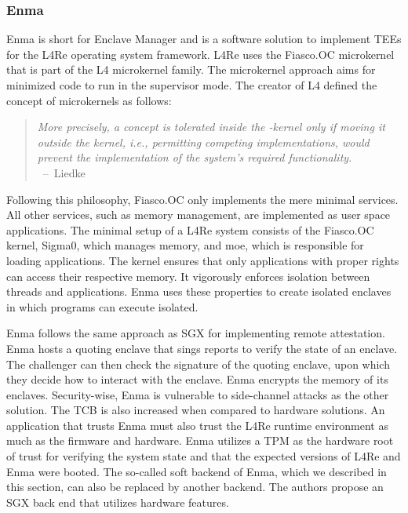 \subsubsection{Enma}
\label{sec:20:enma}
Enma is short for Enclave Manager and is a software solution to implement TEEs for the L4Re operating system framework.
\cite{reitz_isolierende_2019}
L4Re uses the Fiasco.OC microkernel that is part of the L4 microkernel family. The microkernel approach aims for
minimized code to run in the supervisor mode. The creator of L4 defined the concept of microkernels as follows:

\begin{quote}
    \textit{
        More precisely, a concept is tolerated inside the \mu-kernel only if moving it outside the kernel, i.e.,
        permitting competing implementations, would prevent the implementation of the system's required
        functionality. \\
    }
    \mbox{ -- Liedke\cite{liedtke1995micro}}
\end{quote}


Following this philosophy, Fiasco.OC only implements the mere minimal services. All other services, such as memory
management, are implemented as user space applications. The minimal setup of a L4Re system consists of the Fiasco.OC
kernel, Sigma0, which manages memory, and moe, which is responsible for loading applications. The kernel ensures that only
applications with proper rights can access their respective memory. It vigorously enforces isolation between threads and
applications. Enma uses these properties to create isolated enclaves in which programs can execute isolated.

Enma follows the same approach as SGX for implementing remote attestation. Enma
hosts a quoting enclave that sings reports to verify the state of an enclave. The challenger can then check the
signature of the quoting enclave, upon which they decide how to interact with the enclave. Enma encrypts the memory of
its enclaves. Security-wise, Enma is vulnerable to side-channel attacks as the other solution. The TCB is also increased
when compared to hardware solutions. An application that trusts Enma must also trust the L4Re runtime environment as
much as the firmware and hardware. Enma utilizes a TPM as the hardware root of trust for verifying the system state and
that the expected versions of L4Re and Enma were booted. The so-called soft backend of Enma, which we described in this
section, can also be replaced by another backend. The authors propose an SGX back end that utilizes hardware features.

